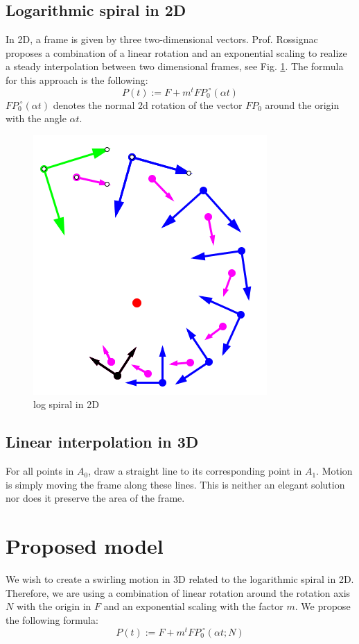 \documentclass[tikz, journal, letterpaper]{IEEEtran}
\begin{document}
\subsection{Logarithmic spiral in 2D}
In 2D, a frame is given by three two-dimensional vectors. Prof. Rossignac proposes a combination of a linear rotation and an exponential scaling to realize a steady interpolation between two dimensional frames, see Fig. \ref{fig:P6}.
The formula for this approach is the following:
\begin{equation}
 P(t) := F + m^t FP_0 ^{\;\circ} (\alpha t)
\label{eq:logSpiral}
\end{equation}
$FP_0 ^{\;\circ} (\alpha t)$ denotes the normal 2d rotation of the vector $FP_0$ around the origin with the angle $\alpha t$.
\begin{figure}[H]
	\centering
		\includegraphics[scale=0.4]{pictures/P6.png}
	\caption{log spiral in 2D}
	\label{fig:P6}
\end{figure}

\subsection{Linear interpolation in 3D}
For all points in $A_0$, draw a straight line to its corresponding point in $A_1$. Motion is simply moving the frame along these lines.  This is neither an elegant solution nor does it preserve the area of the frame.

\section{Proposed model}
We wish to create a swirling motion in 3D related to the logarithmic spiral in 2D. Therefore, we are using a combination of linear rotation around the rotation axis $N$ with the origin in $F$ and an exponential scaling with the factor $m$. We propose the following formula:
\begin{equation}
 P(t) := F + m^t FP_0 ^{\;\circ} (\alpha t; N)
\label{eq:Interpolation}
\end{equation}
\end{document}
